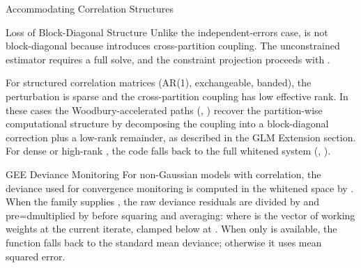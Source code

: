 \begin{Section}{Accommodating Correlation Structures}
%
\begin{SubSection}{Loss of Block-Diagonal Structure}
Unlike the independent-errors case,
 is not block-diagonal
because  introduces cross-partition coupling. The
unconstrained estimator
requires a full  solve, and the constraint projection
proceeds with
.

For structured correlation matrices (AR(1), exchangeable, banded), the
perturbation  is sparse and the
cross-partition coupling has low effective rank. In these cases the
Woodbury-accelerated paths
(,
) recover the partition-wise
computational structure by decomposing the coupling into a
block-diagonal correction plus a low-rank remainder, as described in the
GLM Extension section. For dense or high-rank
, the code falls back to the full whitened system
(, ).
\end{SubSection}


%
\begin{SubSection}{GEE Deviance Monitoring}
For non-Gaussian models with correlation, the deviance used for
convergence monitoring is computed in the whitened space by
. When the family supplies
, the raw deviance residuals
 are divided by
 and pre=dmultiplied by
 before squaring and averaging:
where  is the vector of working weights at the current
iterate, clamped below at . When
only  is available, the function falls back to the
standard mean deviance; otherwise it uses mean squared error.
\end{SubSection}



\end{Section}
